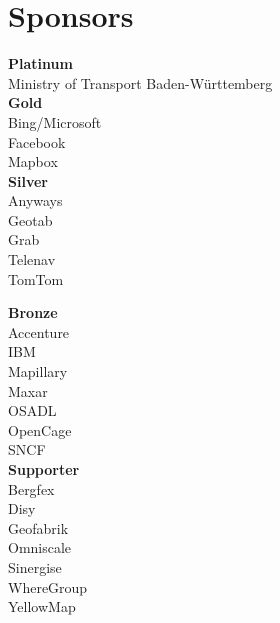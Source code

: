 \section*{Sponsors}
\label{sponsors}
\RaggedRight
\begin{multicols}{2}
  \begin{small}
    \textbf{Platinum}\\
    Ministry of Transport Baden-Württemberg\\

    \vspace{\volunteerSpace}
    \textbf{Gold}\\
    Bing/Microsoft\\
    Facebook\\
    Mapbox\\

    \vspace{\volunteerSpace}
    \textbf{Silver}\\
    Anyways\\
    Geotab\\
    Grab\\
    Telenav\\
    TomTom\\
    \columnbreak

    \vspace{\volunteerSpace}
    \textbf{Bronze}\\
    Accenture\\
    IBM\\
    Mapillary\\
    Maxar\\
    OSADL\\
    OpenCage\\
    SNCF\\

    \vspace{\volunteerSpace}
    \textbf{Supporter}\\
    Bergfex\\
    Disy\\
    Geofabrik\\
    Omniscale\\
    Sinergise\\
    WhereGroup\\
    YellowMap\\

  \end{small}
\end{multicols}

\justifying
